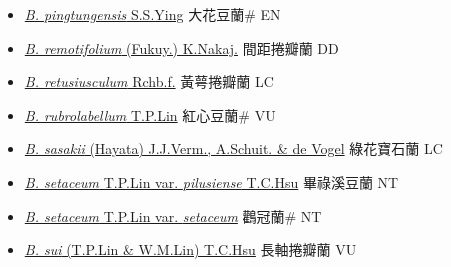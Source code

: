 \begin{itemize}
\begin{itemize}
        \item[] \href{http://www.theplantlist.org/tpl1.1/search?q=Bulbophyllum+pingtungensis}{\textit{B. pingtungensis} S.S.Ying}   大花豆蘭\# EN
        \item[] \href{http://www.theplantlist.org/tpl1.1/search?q=Bulbophyllum+remotifolium}{\textit{B. remotifolium} (Fukuy.) K.Nakaj.}   間距捲瓣蘭 DD
        \item[] \href{http://www.theplantlist.org/tpl1.1/search?q=Bulbophyllum+retusiusculum}{\textit{B. retusiusculum} Rchb.f.}   黃萼捲瓣蘭 LC
        \item[] \href{http://www.theplantlist.org/tpl1.1/search?q=Bulbophyllum+rubrolabellum}{\textit{B. rubrolabellum} T.P.Lin}   紅心豆蘭\# VU
        \item[] \href{http://www.theplantlist.org/tpl1.1/search?q=Bulbophyllum+sasakii}{\textit{B. sasakii} (Hayata) J.J.Verm., A.Schuit. \& de Vogel}     綠花寶石蘭 LC
        \item[] \href{http://www.theplantlist.org/tpl1.1/search?q=Bulbophyllum+setaceum+var.+pilusiense}{\textit{B. setaceum} T.P.Lin var. \textit{pilusiense} T.C.Hsu}   畢祿溪豆蘭 NT
        \item[] \href{http://www.theplantlist.org/tpl1.1/search?q=Bulbophyllum+setaceum+var.+setaceum}{\textit{B. setaceum} T.P.Lin var. \textit{setaceum}}   鸛冠蘭\# NT
        \item[] \href{http://www.theplantlist.org/tpl1.1/search?q=Bulbophyllum+sui}{\textit{B. sui} (T.P.Lin \& W.M.Lin) T.C.Hsu}     長軸捲瓣蘭 VU

\end{itemize}
\end{itemize}
